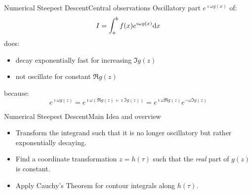 \documentclass{beamer}
\begin{document}
\begin{frame}{Numerical Steepest Descent}{Central observations}
  Oscillatory part $e^{\imath \omega g(x)}$ of:
  \begin{equation*}
    I = \int_a^b f(x) e^{\imath \omega g(x)} \mathrm{d}x
  \end{equation*}
  does:
  \begin{itemize}
    \item decay exponentially fast for increasing $\Im g(z)$
    \item not oscillate for constant $\Re g(z)$
  \end{itemize}
  because:
  \begin{equation*}
    e^{\imath \omega g(z)}
    =
    e^{\imath \omega (\Re g(z) + \imath \Im g(z))}
    =
    e^{\imath \omega \Re g(z)}
    e^{- \omega \Im g(z)}
  \end{equation*}
\end{frame}


\begin{frame}{Numerical Steepest Descent}{Main Idea and overview}
  \begin{itemize}
    \item Transform the integrand such that it is no longer oscillatory but rather exponentially decaying.
  \end{itemize}
  \vspace{1cm}
  \begin{itemize}
    \item Find a coordinate transformation $z = h(\tau)$ such that the \emph{real} part
          of $g(z)$ is constant.
    \item Apply Cauchy's Theorem for contour integrals along $h(\tau)$.
  \end{itemize}
\end{frame}
\end{document}
